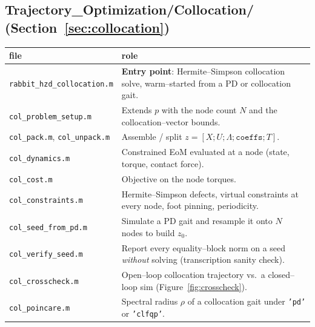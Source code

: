\documentclass[11pt,a4paper]{article}
\newcommand{\code}[1]{\texttt{#1}}          %
\newcommand{\fname}[1]{\texttt{#1}}          %
\begin{document}
\subsection*{Trajectory\_Optimization/Collocation/ (Section~\ref{sec:collocation})}
\begin{longtable}{@{}L{4.7cm} L{9.5cm}@{}}
\toprule file & role \\ \midrule \endhead
\fname{rabbit\_hzd\_collocation.m} & \textbf{Entry point}: Hermite--Simpson collocation solve, warm--started from a PD or collocation gait. \\
\fname{col\_problem\_setup.m} & Extends $p$ with the node count $N$ and the collocation--vector bounds. \\
\fname{col\_pack.m}, \fname{col\_unpack.m} & Assemble / split $z = [X;U;\Lambda;\code{coeffs};T]$. \\
\fname{col\_dynamics.m} & Constrained EoM evaluated at a node (state, torque, contact force). \\
\fname{col\_cost.m} & Objective on the node torques. \\
\fname{col\_constraints.m} & Hermite--Simpson defects, virtual constraints at every node, foot pinning, periodicity. \\
\fname{col\_seed\_from\_pd.m} & Simulate a PD gait and resample it onto $N$ nodes to build $z_0$. \\
\fname{col\_verify\_seed.m} & Report every equality--block norm on a seed \emph{without} solving (transcription sanity check). \\
\fname{col\_crosscheck.m} & Open--loop collocation trajectory vs.\ a closed--loop sim (Figure~\ref{fig:crosscheck}). \\
\fname{col\_poincare.m} & Spectral radius $\rho$ of a collocation gait under \code{'pd'} or \code{'clfqp'}. \\
\bottomrule
\end{longtable}
\end{document}
